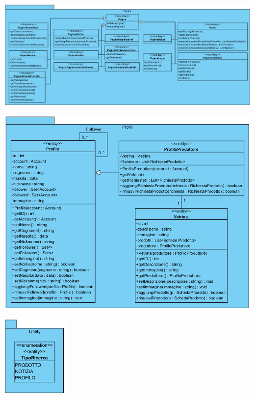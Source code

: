 \begin{landscape}
\begin{center}
			\includegraphics[width=\linewidth]{assets/visualParadigm/classi/Pagine}
\end{center}
\end{landscape}

\begin{center}
			\includegraphics[width=\textwidth]{assets/visualParadigm/classi/Profili}
\end{center}

\begin{center}
			\includegraphics[width=0.25\textwidth]{assets/visualParadigm/classi/Utility}
\end{center}




